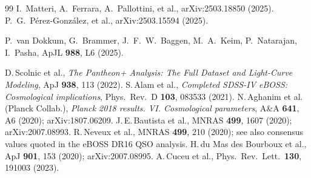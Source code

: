 \documentclass[aps,prd,reprint,onecolumn,nofootinbib]{revtex4-2}
\begin{document}
\begin{thebibliography}{99}
 I.~Matteri, A.~Ferrara, A.~Pallottini, et al., arXiv:2503.18850 (2025).
 P.~G.~P\'erez-Gonz\'alez, et al., arXiv:2503.15594 (2025).

 P.~van Dokkum, G.~Brammer, J.~F.~W.~Baggen, M.~A.~Keim, P.~Natarajan, I.~Pasha, ApJL \textbf{988}, L6 (2025).

 D.\,Scolnic et al., \emph{The Pantheon+ Analysis: The Full Dataset and Light-Curve Modeling}, ApJ \textbf{938}, 113 (2022).
 S.\,Alam et al., \emph{Completed SDSS-IV eBOSS: Cosmological implications}, Phys.\ Rev.\ D \textbf{103}, 083533 (2021).
 N.\,Aghanim et al. (Planck Collab.), \emph{Planck 2018 results. VI. Cosmological parameters}, A\&A \textbf{641}, A6 (2020); arXiv:1807.06209.
 J.\,E.\,Bautista et al., MNRAS \textbf{499}, 1607 (2020); arXiv:2007.08993.
 R.\,Neveux et al., MNRAS \textbf{499}, 210 (2020); see also consensus values quoted in the eBOSS DR16 QSO analysis.
 H.\,du Mas des Bourboux et al., ApJ \textbf{901}, 153 (2020); arXiv:2007.08995.
 A.\,Cuceu et al., Phys.\ Rev.\ Lett.\ \textbf{130}, 191003 (2023).
\end{thebibliography}
\end{document}
